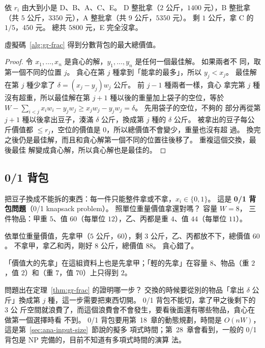依 $r_i$ 由大到小是 D、B、A、C、E。 D 整批拿（$2$ 公斤，$1400$ 元），B 整批拿（共
$5$ 公斤，$3350$ 元），A 整批拿（共 $9$ 公斤，$5350$ 元）。 剩 $1$ 公斤，拿 C 的
$1/5$，$450$ 元。 總共 $5800$ 元，E 完全沒拿。

\begin{theorem}
\label{thm:gr-frac}
虛擬碼~\ref{alg:gr-frac} 得到分數背包的最大總價值。
\end{theorem}

\begin{proof}
令 $x_1, \ldots, x_n$ 是貪心的解，$y_1, \ldots, y_n$ 是任何一個最佳解。 如果兩者不
同，取第一個不同的位置 $j$。 貪心在第 $j$ 種拿到「能拿的最多」，所以 $y_j < x_j$。
最佳解在第 $j$ 種少拿了 $\delta = (x_j - y_j) w_j$ 公斤。 前 $j - 1$ 種兩者一樣，貪心
拿完第 $j$ 種沒有超重，所以最佳解在第 $j + 1$ 種以後的重量加上袋子的空位，等於
$W - \sum_{i<j} x_i w_i - y_j w_j \ge x_j w_j - y_j w_j = \delta$。 先用袋子的空位，不夠的
部分再從第 $j + 1$ 種以後拿出豆子，湊滿 $\delta$ 公斤，換成第 $j$ 種的 $\delta$ 公斤。
被拿出的豆子每公斤價值都 $\le r_j$，空位的價值是 $0$，所以總價值不會變少，重量也沒有超
過。 換完之後仍是最佳解，而且和貪心解第一個不同的位置往後移了。 重複這個交換，最後最佳
解變成貪心解，所以貪心解也是最佳的。
\end{proof}

\subsection{0/1 背包}

把豆子換成不能拆的東西：每一件只能整件拿或不拿，$x_i \in \{0, 1\}$。 這是
\textbf{0/1 背包問題}（0/1 knapsack problem）。 照單位重量價值拿還對嗎？ 容量 $W = 8$，
三件物品：甲重 $5$、值 $60$（每單位 $12$），乙、丙都是重 $4$、值 $44$（每單位 $11$）。

依單位重量價值，先拿甲（$5$ 公斤，$60$），剩 $3$ 公斤，乙、丙都放不下，總價值 $60$。
不拿甲，拿乙和丙，剛好 $8$ 公斤，總價值 $88$。 貪心錯了。

「價值大的先拿」在這組資料上也是先拿甲；「輕的先拿」在容量 $8$、物品（重 $2$，值
$2$）和（重 $7$，值 $70$）上只得到 $2$。

問題出在定理~\ref{thm:gr-frac} 的證明哪一步？ 交換的時候要從別的物品「拿出 $\delta$
公斤」換成第 $j$ 種，這一步需要把東西切開。 0/1 背包不能切，拿了甲之後剩下的 $3$ 公
斤空間就浪費了，而這個浪費會不會發生，要看後面還有哪些物品，貪心在做第一個選擇時看
不到。 0/1 背包要用第~18~章的動態規劃，時間是 $O(nW)$，這是第~\ref{sec:ana-input-size}~節說的擬多
項式時間；第~28~章會看到，一般的 0/1 背包是 NP 完備的，目前不知道有多項式時間的演算
法。

